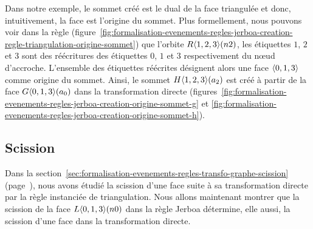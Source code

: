 Dans notre exemple, le sommet créé est le dual de la face triangulée et donc,
intuitivement, la face est l'origine du sommet. %
Plus formellement, nous pouvons voir dans la règle
(figure~\ref{fig:formalisation-evenements-regles-jerboa-creation-regle-triangulation-origine-sommet})
que l'orbite \(R\langle1,2,3\rangle(n2)\), les étiquettes \(1\), \(2\) et \(3\) sont
des réécritures des étiquettes \(0\), \(1\) et \(3\) respectivement du n\oe ud
d'accroche. %
L'ensemble des étiquettes réécrites désignent alors une face \(\langle0,1,3\rangle\)
comme origine du sommet. %
Ainsi, le sommet \(H\langle1,2,3\rangle(a_{2})\) est créé à partir de la face
\(G\langle0,1,3\rangle(a_{0})\) dans la transformation directe
(figures~\ref{fig:formalisation-evenements-regles-jerboa-creation-origine-sommet-g}
et \ref{fig:formalisation-evenements-regles-jerboa-creation-origine-sommet-h}). %

\subsection{Scission}

Dans la
section~\ref{sec:formalisation-evenements-regles-transfo-graphe-scission} (page~\pageref{sec:formalisation-evenements-regles-transfo-graphe-scission}), nous avons étudié la scission d'une face suite à sa transformation directe par la règle instanciée de triangulation. %
Nous allons maintenant montrer que la scission de la face \(L\langle0,1,3\rangle(n0)\)
dans la règle Jerboa détermine, elle aussi, la scission d'une face dans la
transformation directe. %

